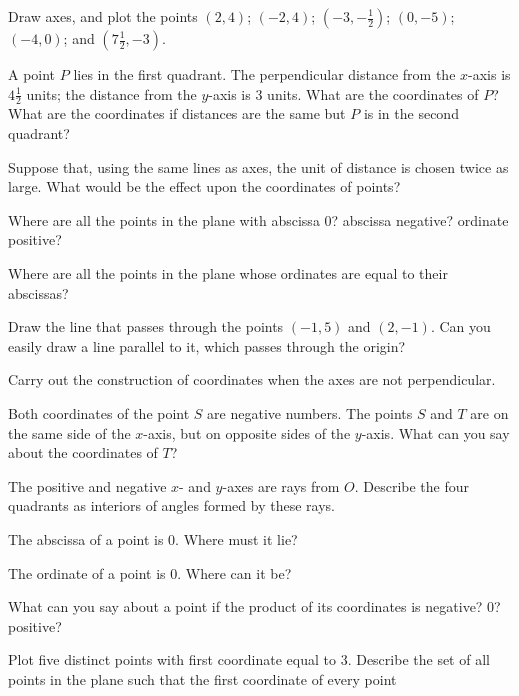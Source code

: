 \documentclass[11pt]{book}
\theoremstyle{bkplain}
\theoremstyle{XIplainnote}
\theoremstyle{bkplain}
\theoremstyle{bkplain}
\begin{document}
\begin{exercisecols}
\begin{exlist}
\item Draw axes, and plot the points $(2, 4)$; $(-2, 4)$;
  $(-3, -\tfrac{1}{2})$; $(0, -5)$; $(-4, 0)$; and $(7\tfrac{1}{2}, -3)$.
\item A point $P$ lies in the first quadrant. The perpendicular distance from
  the $x$-axis is $4\tfrac{1}{2}$ units; the distance from the $y$-axis is 3
  units. What are the coordinates of $P$? What are the coordinates if
  distances are the same but $P$ is in the second quadrant?
\item[\stex 3.] Suppose that, using the same lines as axes, the unit of
  distance is chosen twice as large. What would be the effect upon the
  coordinates of points?
\item[\stex 4.] Where are all the points in the plane with abscissa 0?
  abscissa negative? ordinate positive?
\item[\stex 5.] Where are all the points in the plane whose ordinates are
  equal to their abscissas?
\item[6.] Draw the line that passes through the points $(-1, 5)$ and
  $(2, -1)$. Can you easily draw a line parallel to it, which passes through
  the origin?
\item[\stex 7.] Carry out the construction of coordinates when the axes are
  not perpendicular.
\item[8.] Both coordinates of the point $S$ are negative numbers. The points
  $S$ and $T$ are on the same side of the $x$-axis, but on opposite sides of
  the $y$-axis. What can you say about the coordinates of $T$?
\setcounter{exlisti}{8}
\item The positive and negative $x$- and $y$-axes are rays from $O$. Describe
  the four quadrants as interiors of angles formed by these rays.
\item The abscissa of a point is 0. Where must it lie?
\item The ordinate of a point is 0. Where can it be?
\item What can you say about a point if the product of its coordinates is
  negative? 0? positive?
\item Plot five distinct points with first coordinate equal to 3. Describe the
  set of all points in the plane such that the first coordinate of every point

\end{exlist}
\end{exercisecols}
\end{document}
